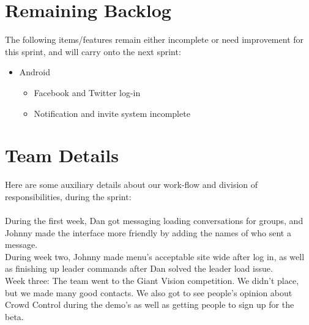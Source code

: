 \documentclass[11pt]{article}
\begin{document}
\section*{Remaining Backlog}
The following items/features remain either incomplete or need improvement for this sprint, and will carry onto the next sprint:
	\begin{itemize}
		\item Android
		\begin{itemize}
			\item Facebook and Twitter log-in
			\item Notification and invite system incomplete
		\end{itemize}
	\end{itemize}


	
\section*{Team Details}
Here are some auxiliary details about our work-flow and division of responsibilities, during the sprint: \\\\

During the first week, Dan got messaging loading conversations for groups, and Johnny made the interface more friendly by adding the names of who sent a message.\\

During week two, Johnny made menu's acceptable site wide after log in, as well as finishing up leader commands after Dan solved the leader load issue. \\

Week three: The team went to the Giant Vision competition. We didn't place, but we made many good contacts. We also got to see people's opinion about Crowd Control during the demo's as well as getting people to sign up for the beta. \\
\end{document}
